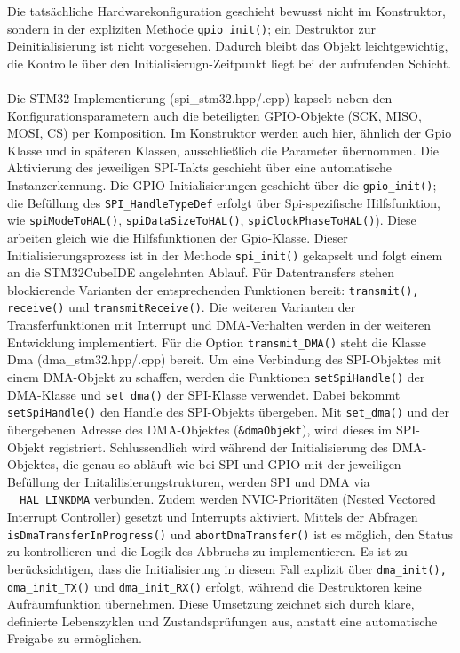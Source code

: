 Die tatsächliche Hardwarekonfiguration geschieht bewusst nicht im Konstruktor, sondern in der expliziten Methode \texttt{gpio\_init()}; ein Destruktor zur Deinitialisierung ist nicht vorgesehen.
Dadurch bleibt das Objekt leichtgewichtig, die Kontrolle über den Initialisierugn-Zeitpunkt liegt bei der aufrufenden Schicht.
\\
\\
Die STM32-Implementierung (spi\_stm32.hpp/.cpp) kapselt neben den Konfigurationsparametern auch die beteiligten GPIO-Objekte (SCK, MISO, MOSI, CS) per Komposition. 
Im Konstruktor werden auch hier, ähnlich der Gpio Klasse und in späteren Klassen, ausschließlich die Parameter übernommen. 
Die Aktivierung des jeweiligen SPI-Takts geschieht über eine automatische Instanzerkennung.
Die GPIO-Initialisierungen geschieht über die \texttt{gpio\_init()}; 
die Befüllung des \texttt{SPI\_HandleTypeDef}  erfolgt über Spi-spezifische Hilfsfunktion, wie \texttt{spiModeToHAL()}, \texttt{spiDataSizeToHAL()}, \texttt{spiClockPhaseToHAL()}). 
Diese arbeiten gleich wie die Hilfsfunktionen der Gpio-Klasse.
Dieser Initialisierungsprozess ist in der Methode \texttt{spi\_init()} gekapselt und folgt einem an die STM32CubeIDE angelehnten Ablauf.
Für Datentransfers stehen blockierende Varianten der entsprechenden Funktionen bereit: \texttt{transmit(), receive()} und \texttt{transmitReceive()}.%
Die weiteren Varianten der Transferfunktionen mit Interrupt und DMA-Verhalten werden in der weiteren Entwicklung implementiert.
Für die Option \texttt{transmit\_DMA()} steht die Klasse Dma (dma\_stm32.hpp/.cpp) bereit.
Um eine Verbindung des SPI-Objektes mit einem DMA-Objekt zu schaffen, werden die Funktionen \texttt{setSpiHandle()} der DMA-Klasse und \texttt{set\_dma()} der SPI-Klasse verwendet.
Dabei bekommt \texttt{setSpiHandle()} den Handle des SPI-Objekts übergeben.
Mit \texttt{set\_dma()} und der übergebenen Adresse des DMA-Objektes (\texttt{\&dmaObjekt}), wird dieses im SPI-Objekt registriert.
Schlussendlich wird während der Initialisierung des DMA-Objektes, die genau so abläuft wie bei SPI und GPIO mit der jeweiligen Befüllung der Initalilisierungstrukturen, werden SPI und DMA via \texttt{\_\_HAL\_LINKDMA} verbunden.
Zudem werden NVIC-Prioritäten (Nested Vectored Interrupt Controller) gesetzt und Interrupts aktiviert.
Mittels der Abfragen \texttt{isDmaTransferInProgress()} und \texttt{abortDmaTransfer()} ist es möglich, den Status zu kontrollieren und die Logik des Abbruchs zu implementieren.
Es ist zu berücksichtigen, dass die Initialisierung in diesem Fall explizit über \texttt{dma\_init(), dma\_init\_TX()} und \texttt{dma\_init\_RX()} erfolgt, während die Destruktoren keine Aufräumfunktion übernehmen.
Diese Umsetzung zeichnet sich durch klare, definierte Lebenszyklen und Zustandsprüfungen aus, anstatt eine automatische Freigabe zu ermöglichen.

